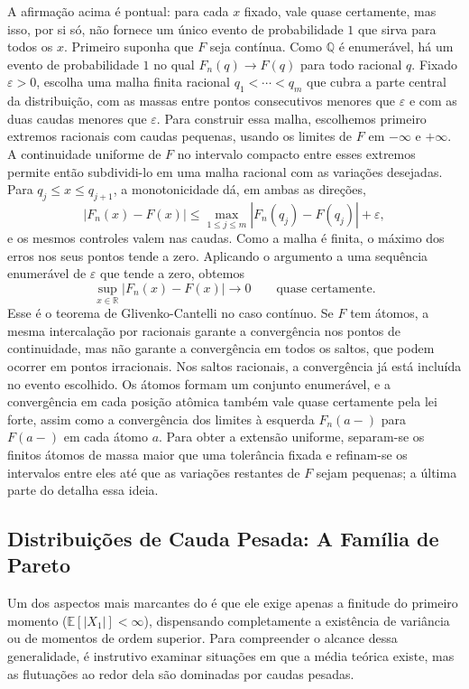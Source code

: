 \documentclass[12pt,portuguese]{article}
\theoremstyle{definition}
\theoremstyle{plainexercise}
\theoremstyle{starredexercise}
\theoremstyle{definition}
\begin{document}
A afirmação acima é pontual: para cada $x$ fixado, vale quase certamente, mas
isso, por si só, não fornece um único evento de probabilidade $1$ que sirva para
todos os $x$. Primeiro suponha que $F$ seja contínua. Como $\mathbb{Q}$ é
enumerável, há um evento de probabilidade $1$ no qual $F_n(q)\to F(q)$ para
todo racional $q$. Fixado $\varepsilon>0$, escolha uma malha finita racional
$q_1<\cdots<q_m$ que cubra a parte central da distribuição, com as massas
entre pontos consecutivos menores que $\varepsilon$ e com as duas caudas
menores que $\varepsilon$. Para construir essa malha, escolhemos primeiro
extremos racionais com caudas pequenas, usando os limites de $F$ em
$-\infty$ e $+\infty$. A continuidade uniforme de $F$ no intervalo compacto
entre esses extremos permite então subdividi-lo em uma malha racional com
as variações desejadas. Para $q_j\leqslant x\leqslant q_{j+1}$, a
monotonicidade dá, em ambas as direções,
\[
|F_n(x)-F(x)|\leqslant
\max_{1\leqslant j\leqslant m}|F_n(q_j)-F(q_j)|+\varepsilon,
\]
e os mesmos controles valem nas caudas. Como a malha é finita, o máximo dos
erros nos seus pontos tende a zero. Aplicando o argumento a uma sequência
enumerável de $\varepsilon$ que tende a zero, obtemos
\[
\sup_{x\in\mathbb{R}}\bigl|F_n(x)-F(x)\bigr|\longrightarrow0
\qquad\text{quase certamente.}
\]
Esse é o teorema de Glivenko-Cantelli no caso contínuo. Se $F$ tem átomos, a
mesma intercalação por racionais garante a convergência nos pontos de
continuidade, mas não garante a convergência em todos os saltos, que podem
ocorrer em pontos irracionais. Nos saltos racionais, a convergência já está
incluída no evento escolhido. Os átomos formam um
conjunto enumerável, e a convergência em cada posição atômica também vale quase
certamente pela lei forte, assim como a convergência dos limites à esquerda
$F_n(a-)$ para $F(a-)$ em cada átomo $a$. Para obter a extensão uniforme,
separam-se os finitos átomos de massa maior que uma tolerância fixada e refinam-se os
intervalos entre eles até que as variações restantes de $F$ sejam pequenas; a
última parte do  detalha essa ideia.

\subsection{Distribuições de Cauda Pesada: A Família de Pareto}\label{subsec:pareto}

Um dos aspectos mais marcantes do  é que ele exige apenas a
finitude do primeiro momento ($\mathbb{E}[|X_1|]<\infty$), dispensando
completamente a existência de variância ou de momentos de ordem superior. Para
compreender o alcance dessa generalidade, é instrutivo examinar situações em que
a média teórica existe, mas as flutuações ao redor dela são dominadas por caudas
pesadas.
\end{document}
